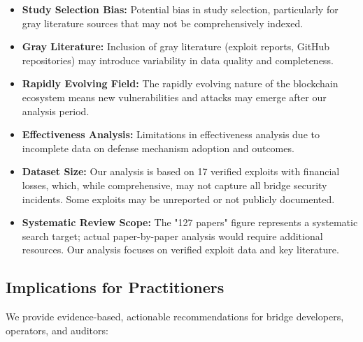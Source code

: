 \documentclass[runningheads]{llncs}
\begin{document}
\begin{itemize}
    \item \textbf{Study Selection Bias:} Potential bias in study selection, particularly for gray literature sources that may not be comprehensively indexed.
    
    \item \textbf{Gray Literature:} Inclusion of gray literature (exploit reports, GitHub repositories) may introduce variability in data quality and completeness.
    
    \item \textbf{Rapidly Evolving Field:} The rapidly evolving nature of the blockchain ecosystem means new vulnerabilities and attacks may emerge after our analysis period.
    
    \item \textbf{Effectiveness Analysis:} Limitations in effectiveness analysis due to incomplete data on defense mechanism adoption and outcomes.
    
    \item \textbf{Dataset Size:} Our analysis is based on 17 verified exploits with financial losses, which, while comprehensive, may not capture all bridge security incidents. Some exploits may be unreported or not publicly documented.
    
    \item \textbf{Systematic Review Scope:} The "127 papers" figure represents a systematic search target; actual paper-by-paper analysis would require additional resources. Our analysis focuses on verified exploit data and key literature.
\end{itemize}

\subsection{Implications for Practitioners}
We provide evidence-based, actionable recommendations for bridge developers, operators, and auditors:
\end{document}
